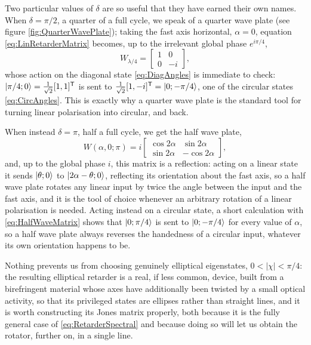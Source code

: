             Two particular values of $\delta$ are so useful that they have earned their own names. When $\delta=\pi/2$, a quarter of a full cycle, we speak of a quarter wave plate (see figure \ref{fig:QuarterWavePlate}); taking the fast axis horizontal, $\alpha=0$, equation \ref{eq:LinRetarderMatrix} becomes, up to the irrelevant global phase $e^{i\pi/4}$,
            \begin{equation}\label{eq:QuarterWaveMatrix}
                W_{\lambda/4} = \begin{bmatrix}1 & 0\\ 0 & -i\end{bmatrix},
            \end{equation}
            whose action on the diagonal state \ref{eq:DiagAngles} is immediate to check: $\ket{\pi/4;0}=\frac{1}{\sqrt2}[1,1]^{\mathsf T}$ is sent to $\frac{1}{\sqrt2}[1,-i]^{\mathsf T}=\ket{0;-\pi/4}$, one of the circular states \ref{eq:CircAngles}. This is exactly why a quarter wave plate is the standard tool for turning linear polarisation into circular, and back.

            When instead $\delta=\pi$, half a full cycle, we get the half wave plate,
            \begin{equation}\label{eq:HalfWaveMatrix}
                W(\alpha,0;\pi) = i\begin{bmatrix}\cos2\alpha & \sin2\alpha\\ \sin2\alpha & -\cos2\alpha\end{bmatrix},
            \end{equation}
            and, up to the global phase $i$, this matrix is a reflection: acting on a linear state it sends $\ket{\theta;0}$ to $\ket{2\alpha-\theta;0}$, reflecting its orientation about the fast axis, so a half wave plate rotates any linear input by twice the angle between the input and the fast axis, and it is the tool of choice whenever an arbitrary rotation of a linear polarisation is needed. Acting instead on a circular state, a short calculation with \ref{eq:HalfWaveMatrix} shows that $\ket{0;\pi/4}$ is sent to $\ket{0;-\pi/4}$ for every value of $\alpha$, so a half wave plate always reverses the handedness of a circular input, whatever its own orientation happens to be.

            Nothing prevents us from choosing genuinely elliptical eigenstates, $0<|\chi|<\pi/4$: the resulting elliptical retarder is a real, if less common, device, built from a birefringent material whose axes have additionally been twisted by a small optical activity, so that its privileged states are ellipses rather than straight lines, and it is worth constructing its Jones matrix properly, both because it is the fully general case of \ref{eq:RetarderSpectral} and because doing so will let us obtain the rotator, further on, in a single line.

